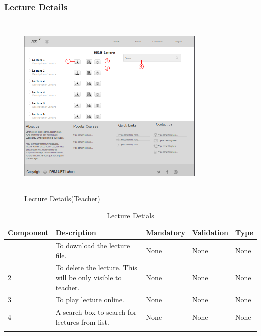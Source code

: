 \documentclass[12pt]{article}
\begin{document}
\subsubsection{Lecture Details}
\begin{figure}[H]
  \centering
  \includegraphics[width=9cm, height=9cm]{LectureDetails(Teacher)}
  \caption{Lecture Details(Teacher)}
\end{figure}

\newpage

\begin{longtable}{|>{\raggedright\arraybackslash}p{2.5cm}|>{\raggedright\arraybackslash}p{4cm}|>{\raggedright\arraybackslash}p{2.2cm}|>{\raggedright\arraybackslash}p{2cm}|>{\raggedright\arraybackslash}p{2cm}|}
\hline
\textbf{Component} & \textbf{Description} & \textbf{Mandatory} & \textbf{Validation} & \textbf{Type}\\
\hline
1 &
To download the lecture file. &
None &
None &
None\\
\hline

2 &
To delete the lecture. This will be only visible to teacher. &
None &
None &
None \\
\hline

3 &
To play lecture online. &
None &
None &
None \\
\hline

4 &
A search box to search for lectures from list. &
None &
None &
None \\
\hline

\caption{Lecture Detials}
\end{longtable}
\end{document}
